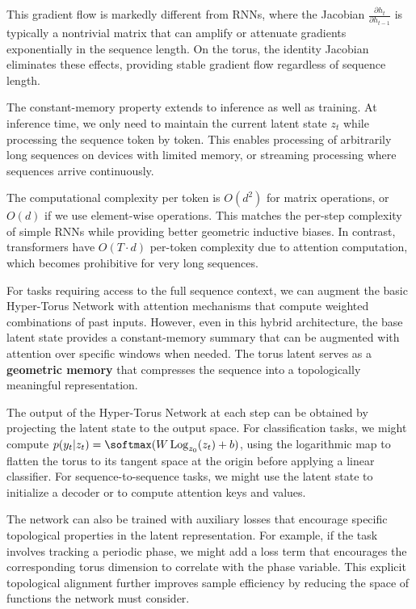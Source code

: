 \documentclass[12pt,letterpaper,twoside]{article}
\DeclareMathOperator{\Log}{Log}
\begin{document}
This gradient flow is markedly different from RNNs, where the Jacobian $\frac{\partial h_t}{\partial h_{t-1}}$ is typically a nontrivial matrix that can amplify or attenuate gradients exponentially in the sequence length. On the torus, the identity Jacobian eliminates these effects, providing stable gradient flow regardless of sequence length.

The constant-memory property extends to inference as well as training. At inference time, we only need to maintain the current latent state $z_t$ while processing the sequence token by token. This enables processing of arbitrarily long sequences on devices with limited memory, or streaming processing where sequences arrive continuously.

The computational complexity per token is $O(d^2)$ for matrix operations, or $O(d)$ if we use element-wise operations. This matches the per-step complexity of simple RNNs while providing better geometric inductive biases. In contrast, transformers have $O(T \cdot d)$ per-token complexity due to attention computation, which becomes prohibitive for very long sequences.

For tasks requiring access to the full sequence context, we can augment the basic Hyper-Torus Network with attention mechanisms that compute weighted combinations of past inputs. However, even in this hybrid architecture, the base latent state provides a constant-memory summary that can be augmented with attention over specific windows when needed. The torus latent serves as a \textbf{geometric memory} that compresses the sequence into a topologically meaningful representation.

The output of the Hyper-Torus Network at each step can be obtained by projecting the latent state to the output space. For classification tasks, we might compute $p(y_t | z_t) = \softmax(W \Log_{z_0}(z_t) + b)$, using the logarithmic map to flatten the torus to its tangent space at the origin before applying a linear classifier. For sequence-to-sequence tasks, we might use the latent state to initialize a decoder or to compute attention keys and values.

The network can also be trained with auxiliary losses that encourage specific topological properties in the latent representation. For example, if the task involves tracking a periodic phase, we might add a loss term that encourages the corresponding torus dimension to correlate with the phase variable. This explicit topological alignment further improves sample efficiency by reducing the space of functions the network must consider.
\end{document}
